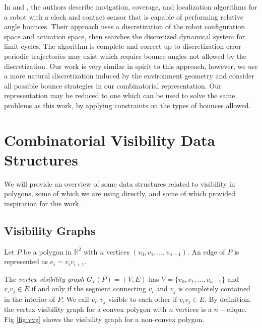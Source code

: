 \documentclass[letterpaper, 10 pt, conference]{ieeeconf}  %
\begin{document}
In \cite{alam2017minimalist} and \cite{alam2018space}, the authors describe navigation, coverage, and localization algorithms for a robot with a clock and contact sensor that is capable of performing relative angle bounces. Their approach uses a discretization of the robot configuration space and actuation space, then searches the discretized dynamical system for limit cycles. The algorithm is complete and correct up to discretization error - periodic trajectories may exist which require bounce angles not allowed by the discretization. Our work is very similar in spirit to this approach, however, we use a more natural discretization induced by the environment geometry and consider all possible bounce strategies in our combinatorial representation. Our representation may be reduced to one which can be used to solve the same problems as this work, by applying constraints on the types of bounces allowed.



\section{Combinatorial Visibility Data Structures}

We will provide an overview of some data structures related to visibility in polygons, some of which we are using directly, and some of which provided inspiration for this work.

\subsection{Visibility Graphs}


Let $P$ be a polygon in $\mathbb{R}^2$ with $n$ vertices $(v_0, v_1, \ldots, v_{n-1})$. An edge of $P$ is represented as $e_i = v_iv_{i+1}$. 

The \textit{vertex visibility graph} $G_V(P) = (V, E)$ has $V = \{v_0, v_1, \ldots, v_{n-1}\}$ and $v_iv_j\in E$ if and only if the segment connecting $v_i$ and $v_j$ is completely contained in the interior of $P$. We call $v_i, v_j$ visible to each other if $v_iv_j\in E$. By definition, the vertex visibility graph for a convex polygon with $n$ vertices is a $n-$clique. Fig
\ref{fig:vvg} shows the visibility graph for a non-convex polygon.
\end{document}
